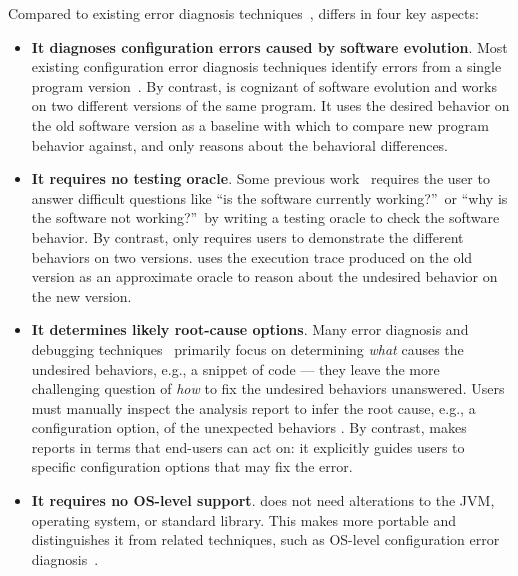 Compared to existing error diagnosis
techniques~\cite{Wang:2004:AMT, Rabkin:2011:PPC, Whitaker:2004:CDS,
Zhang:2013:ADS, Attariyan:2010:ACT, Su:2007:AIC, Attariyan:2008:UCD, xray
}, \ourtool differs in four
key aspects:

\vspace{-1mm}

\begin{itemize}
\vspace{-1mm}
\item \textbf{It diagnoses configuration errors caused by software evolution}.
Most existing configuration error diagnosis techniques
identify errors from a single program
version~\cite{Wang:2004:AMT, Rabkin:2011:PPC, Whitaker:2004:CDS,
Zhang:2013:ADS, Attariyan:2010:ACT, Su:2007:AIC, Attariyan:2008:UCD, xray}.
By contrast, \ourtool is cognizant of software evolution and
works on two different versions of the same program. 
It uses the desired behavior on the old software version
as a baseline with which to compare new program behavior against, and only
reasons about the behavioral differences.

\item \textbf{It requires no testing oracle}.
Some previous work~\cite{Rabkin:2011:PPC, Whitaker:2004:CDS,
Attariyan:2010:ACT, Su:2007:AIC} requires the user to answer difficult
questions like ``is the software currently working?''\ or ``why is the
software not working?''\ by writing a testing
oracle to check the software behavior. By contrast,
\ourtool only requires users to
demonstrate the different behaviors on two versions.
\ourtool uses the execution trace produced on the old
version as an approximate oracle to
reason about the undesired behavior on the new version.

\item \textbf{It determines likely root-cause options}.
Many error diagnosis and debugging techniques~\cite{dd, autoflow}
primarily focus on
determining \textit{what} causes the undesired behaviors, e.g.,
a snippet of code --- they leave the more challenging
question of \textit{how} to fix the undesired behaviors
unanswered.  Users must manually inspect the analysis
report to infer
the root cause, e.g., a configuration option,
of the unexpected behaviors .
By contrast, \ourtool makes reports in terms that 
end-users can act on:  it explicitly guides users to specific
configuration options that may fix the error.

\item \textbf{It requires no OS-level support}. \ourtool
does not need alterations to the JVM, operating system, or
standard library. This makes \ourtool more portable and
distinguishes it from related techniques, such as
OS-level configuration error diagnosis~\cite{Whitaker:2004:CDS, Su:2007:AIC}.

\end{itemize}

